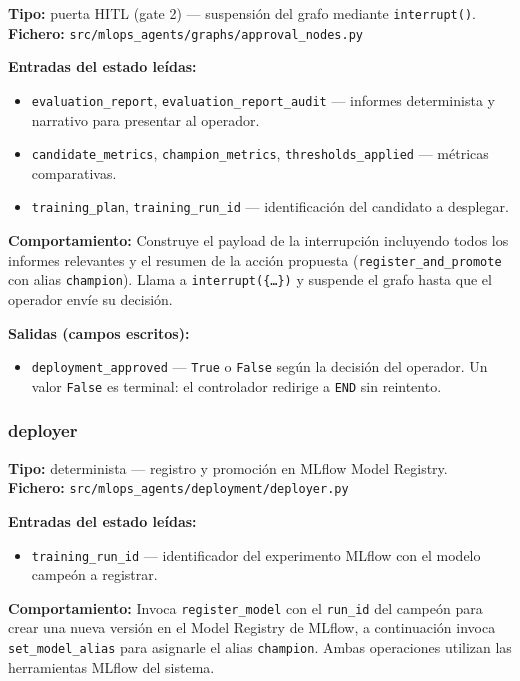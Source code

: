 \textbf{Tipo:} puerta HITL (gate 2) --- suspensión del grafo mediante \texttt{interrupt()}.\\
\textbf{Fichero:} \texttt{src/mlops\_agents/graphs/approval\_nodes.py}

\textbf{Entradas del estado leídas:}
\begin{itemize}
  \item \texttt{evaluation\_report}, \texttt{evaluation\_report\_audit} — informes determinista y narrativo para presentar al operador.
  \item \texttt{candidate\_metrics}, \texttt{champion\_metrics}, \texttt{thresholds\_applied} — métricas comparativas.
  \item \texttt{training\_plan}, \texttt{training\_run\_id} — identificación del candidato a desplegar.
\end{itemize}

\textbf{Comportamiento:} Construye el payload de la interrupción incluyendo todos los informes relevantes y el resumen de la acción propuesta (\texttt{register\_and\_promote} con alias \texttt{champion}). Llama a \texttt{interrupt(\{\ldots\})} y suspende el grafo hasta que el operador envíe su decisión.

\textbf{Salidas (campos escritos):}
\begin{itemize}
  \item \texttt{deployment\_approved} — \texttt{True} o \texttt{False} según la decisión del operador. Un valor \texttt{False} es terminal: el controlador redirige a \texttt{END} sin reintento.
\end{itemize}

\subsubsection*{deployer}
\label{sec:nodo-deployer}

\textbf{Tipo:} determinista --- registro y promoción en MLflow Model Registry.\\
\textbf{Fichero:} \texttt{src/mlops\_agents/deployment/deployer.py}

\textbf{Entradas del estado leídas:}
\begin{itemize}
  \item \texttt{training\_run\_id} — identificador del experimento MLflow con el modelo campeón a registrar.
\end{itemize}

\textbf{Comportamiento:} Invoca \texttt{register\_model} con el \texttt{run\_id} del campeón para crear una nueva versión en el Model Registry de MLflow, a continuación invoca \texttt{set\_model\_alias} para asignarle el alias \texttt{champion}. Ambas operaciones utilizan las herramientas MLflow del sistema.

